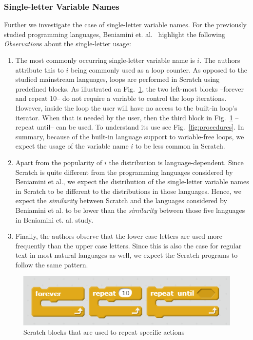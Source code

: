 \documentclass[conference]{IEEEtran}
\begin{document}
\subsubsection{Single-letter Variable Names}
\label{res:var:names}
Further we investigate the case of single-letter variable names. For the previously studied programming languages, Beniamini et. al.~\cite{Beniamini} highlight the following \emph{Observation}s about the single-letter usage: 

\begin{enumerate}[label=\emph{\alph*})]
\item The most commonly occurring single-letter variable name is $i$.
The authors attribute this to $i$ being commonly used as a loop counter. 
As opposed to the studied mainstream languages, loops are performed in Scratch using predefined blocks. 
As illustrated on Fig.~\ref{fig:loop_Scratchblocks}, the  two left-most blocks --forever and repeat 10-- do not require a variable to control the loop iterations. However, inside the loop the user will have no access to the built-in loop's iterator. When that is needed by the user, then the third block in Fig.~\ref{fig:loop_Scratchblocks} --repeat until-- can be used. To understand its use see Fig.~\ref{fig:procedures}. In summary,  because of the built-in language support to variable-free loops, we expect the usage of the variable name $i$ to be less common in Scratch. \label{single-letter-vars:i}

\item Apart from the popularity of $i$ the distribution is language-dependent. 
Since Scratch is quite different from the programming languages considered by Beniamini et al., we expect the distribution of the single-letter variable names in Scratch to be different to the distributions in those languages. 
Hence, we expect the \emph{similarity} between Scratch and the languages considered by Beniamini et al. to be lower than the \emph{similarity} between those five languages in Beniamini et. al. study. \label{single-letter-vars:similarity}

\item Finally, the authors observe that the lower case letters are used more frequently than the upper case letters. Since this is also the case for regular text in most natural languages as well, we expect the Scratch programs to follow the same pattern. \label{single-letter-vars:upercase:lowercase}
\end{enumerate}

\begin{figure}[tb]
	\begin{center}
		\includegraphics[scale=0.48]{fig/loops_in_Scratch}
		\caption{Scratch blocks that are used to repeat specific actions}
		\label{fig:loop_Scratchblocks}
	\end{center}
\end{figure} 
\end{document}
